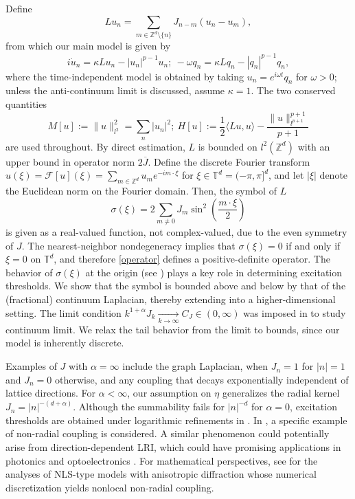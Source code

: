 \documentclass{article}
\numberwithin{equation}{section}
\begin{document}
Define
\begin{equation}\label{operator}        Lu_n = \sum_{m \in \mathbb{Z}^d \setminus{\{n\}}} J_{n-m} (u_n - u_m),
\end{equation}
from which our main model is given by
\begin{equation}\label{main_model}
    i \dot{u}_n = \kappa L u_n - |u_n|^{p-1} u_n;\ -\omega q_n = \kappa L q_n - |q_n|^{p-1} q_n,
\end{equation}
where the time-independent model is obtained by taking $u_n = e^{i \omega t} q_n$ for $\omega > 0$; unless the anti-continuum limit is discussed, assume $\kappa = 1$. The two conserved quantities
\begin{equation*}
M[u] := \| u \|_{l^2}^2 = \sum_{n} |u_n|^2;\ H[u] := \frac{1}{2} \langle Lu, u\rangle -\frac{\| u \|_{l^{p+1}}^{p+1}}{p+1}
\end{equation*}
are used throughout. By direct estimation, $L$ is bounded on $l^2(\mathbb{Z}^d)$ with an upper bound in operator norm $2\overline{J}$. Define the discrete Fourier transform $\widehat{u}(\xi) = \mathcal{F}[u](\xi) = \sum\limits_{m \in \mathbb{Z}^d} u_m e^{-i m \cdot \xi}$ for $\xi \in \mathbb{T}^d = (-\pi,\pi]^d$, and let $|\xi|$ denote the Euclidean norm on the Fourier domain. Then, the symbol of $L$ 
\begin{equation*}
\sigma(\xi) = 2\sum\limits_{m \neq 0} J_{m} \sin^2 \left(\frac{m \cdot \xi}{2}\right)    
\end{equation*}
is given as a real-valued function, not complex-valued, due to the even symmetry of $J$. The nearest-neighbor nondegeneracy implies that $\sigma(\xi) = 0$ if and only if $\xi = 0$ on $\mathbb{T}^d$, and therefore \eqref{operator} defines a positive-definite operator. The behavior of $\sigma(\xi)$ at the origin (see ) plays a key role in determining excitation thresholds. We show that the symbol is bounded above and below by that of the (fractional) continuum Laplacian, thereby extending \cite[Appendix A.1]{kirkpatrick2013continuum} into a higher-dimensional setting. The limit condition $k^{1+\alpha} J_{k} \xrightarrow[k\rightarrow \infty]{} C_{J} \in (0,\infty)$ was imposed in \cite{kirkpatrick2013continuum} to study continuum limit. We relax the tail behavior from the limit to bounds, since our model is inherently discrete.

Examples of $J$ with $\alpha = \infty$ include the graph Laplacian, when $J_n = 1$ for $|n|=1$ and $J_n = 0$ otherwise, and any coupling that decays exponentially independent of lattice directions. For $\alpha < \infty$, our assumption on $\eta$ generalizes the radial kernel $J_{n} = |n|^{-(d+\alpha)}$. Although the summability fails for $|n|^{-d}$ for $\alpha = 0$, excitation thresholds are obtained under logarithmic refinements in . In , a specific example of non-radial coupling is considered. A similar phenomenon could potentially arise from direction-dependent LRI, which could have promising applications in photonics and optoelectronics \cite{li2021review}. For mathematical perspectives, see \cite{gou2023solitary,CHOI2022100406} for the analyses of NLS-type models with anisotropic diffraction whose numerical discretization yields nonlocal non-radial coupling. 
\end{document}

